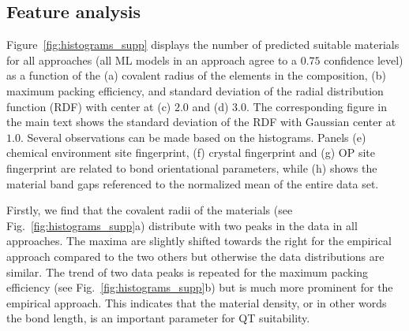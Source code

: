 \documentclass[superscriptaddress,unsortedaddress,
 amsmath,amssymb,
 aps,
]{revtex4-2}
\begin{document}


\subsection*{Feature analysis}
Figure~\ref{fig:histograms_supp} displays the number of predicted suitable materials for all approaches (all ML models in an approach agree to a $0.75$ confidence level) as a function of the (a) covalent radius of the elements in the composition, (b) maximum packing efficiency, and standard deviation of the radial distribution function (RDF) with center at (c) $2.0$ and (d) $3.0$. The corresponding figure in the main text shows the standard deviation of the RDF with Gaussian center at $1.0$. Several observations can be made based on the histograms. Panels (e) chemical environment site fingerprint, (f) crystal fingerprint and (g) OP site fingerprint are related to bond orientational parameters, while (h) shows the material band gaps referenced to the normalized mean of the entire data set.  

Firstly, we find that the covalent radii of the materials (see Fig.~\ref{fig:histograms_supp}a) distribute with two peaks in the data in all approaches. The maxima are slightly shifted towards the right for the empirical approach compared to the two others but otherwise the data distributions are similar. The trend of two data peaks is repeated for the maximum packing efficiency (see Fig.~\ref{fig:histograms_supp}b) but is much more prominent for the empirical approach. This indicates that the material density, or in other words the bond length, is an important parameter for QT suitability.  
\end{document}
